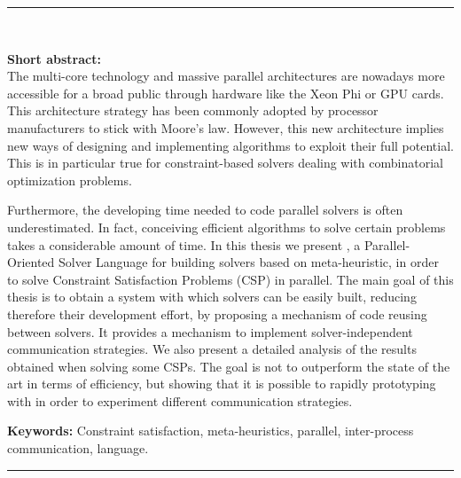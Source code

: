 \cleardoublepage
\begin{vcentrepage}
\noindent\rule[2pt]{\textwidth}{0.8pt}\\
\begin{center}
{\Large\textbf{\titre}}
\end{center}
{\large\textbf{Short abstract:}\\}
The multi-core technology and massive parallel architectures are nowadays more accessible for a broad public through hardware like the Xeon Phi or GPU cards. This architecture strategy has been commonly adopted by processor manufacturers to stick with Moore's law. However, this new architecture implies new ways of designing and implementing algorithms to exploit their full potential. This is in particular true for constraint-based solvers dealing with combinatorial optimization problems.

Furthermore, the developing time needed to code parallel solvers is often underestimated. In fact, conceiving efficient algorithms to solve certain problems takes a considerable amount of time. In this thesis we present \posl{}, a Parallel-Oriented Solver Language for building solvers based on meta-heuristic, in order to solve Constraint Satisfaction Problems (CSP) in parallel. The main goal of this thesis is to obtain a system with which solvers can be easily built, reducing therefore their development effort, by proposing a mechanism of code reusing between solvers. It provides a mechanism to implement solver-independent communication strategies. We also present a detailed analysis of the results obtained when solving some CSPs. The goal is not to outperform the state of the art in terms of efficiency, but showing that it is possible to rapidly prototyping with \posl{} in order to experiment different communication strategies.

{\large\textbf{Keywords:}}
Constraint satisfaction, meta-heuristics, parallel, inter-process communication, language.

\noindent\rule[2pt]{\textwidth}{0.8pt}
\end{vcentrepage}
